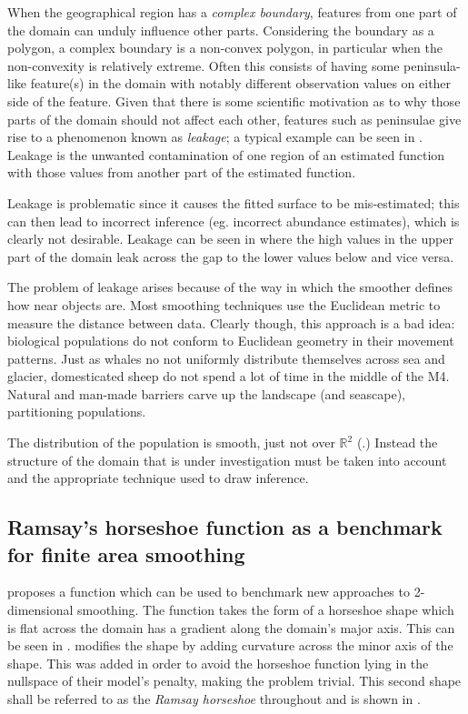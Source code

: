 When the geographical region has a \emph{complex boundary}, features from one part of the domain can unduly influence other parts. Considering the boundary as a polygon, a complex boundary is a non-convex polygon, in particular when the non-convexity is relatively extreme. Often this consists of having some peninsula-like feature(s) in the domain with notably different observation values on either side of the feature. Given that there is some scientific motivation as to why those parts of the domain should not affect each other, features such as peninsulae give rise to a phenomenon known as \emph{leakage}; a typical example can be seen in . Leakage is the unwanted contamination of one region of an estimated function with those values from another part of the estimated function.

Leakage is problematic since it causes the fitted surface to be mis-estimated; this can then lead to incorrect inference (eg. incorrect abundance estimates), which is clearly not desirable. Leakage can be seen in  where the high values in the upper part of the domain leak across the gap to the lower values below and vice versa.

The problem of leakage arises because of the way in which the smoother defines how near objects are. Most smoothing techniques use the Euclidean metric to measure the distance between data. Clearly though, this approach is a bad idea: biological populations do not conform to Euclidean geometry in their movement patterns. Just as whales no not uniformly distribute themselves across sea and glacier, domesticated sheep do not spend a lot of time in the middle of the M4. Natural and man-made barriers carve up the landscape (and seascape), partitioning populations.

The distribution of the population is smooth, just not over $\mathbb{R}^2$ (\cite{wangranalli}.) Instead the structure of the domain that is under investigation must be taken into account and the appropriate technique used to draw inference.

\subsection{Ramsay's horseshoe function as a benchmark for finite area smoothing}

\cite{ramsay} proposes a function which can be used to benchmark new approaches to 2-dimensional smoothing. The function takes the form of a horseshoe shape which is flat across the domain has a gradient along the domain's major axis. This can be seen in . \cite{soap} modifies the shape by adding curvature across the minor axis of the shape. This was added in order to avoid the horseshoe function lying in the nullspace of their model's penalty, making the problem trivial. This second shape shall be referred to as the \emph{Ramsay horseshoe} throughout and is shown in .

